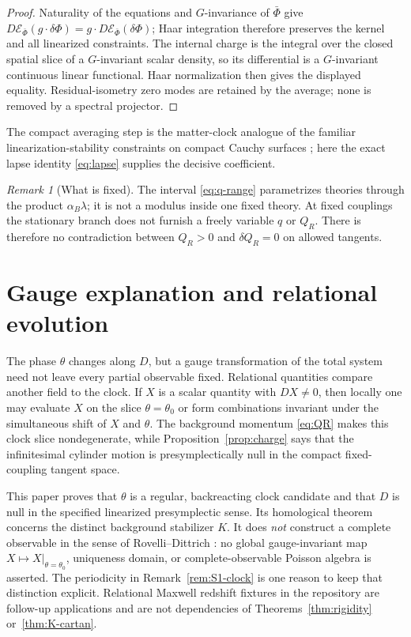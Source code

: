 \documentclass[11pt]{article}
\theoremstyle{definition}
\theoremstyle{remark}
\newtheorem{remark}[theorem]{Remark}
\begin{document}
\begin{proof}
Naturality of the equations and $G$-invariance of $\bar\Phi$ give
$D\mathcal E_{\bar\Phi}(g\cdot\delta\Phi)
=g\cdot D\mathcal E_{\bar\Phi}(\delta\Phi)$; Haar integration therefore
preserves the kernel and all linearized constraints.  The internal charge is
the integral over the closed spatial slice of a $G$-invariant scalar density,
so its differential is a $G$-invariant continuous linear functional.  Haar
normalization then gives the displayed equality.  Residual-isometry zero
modes are retained by the average; none is removed by a spectral projector.
\end{proof}

The compact averaging step is the matter-clock analogue of the familiar
linearization-stability constraints on compact Cauchy surfaces
\cite{LinearizationInstability,AMM}; here the exact lapse identity
\eqref{eq:lapse} supplies the decisive coefficient.

\begin{remark}[What is fixed]
The interval \eqref{eq:q-range} parametrizes theories through the product
$\alpha_B\lambda$; it is not a modulus inside one fixed theory.  At fixed
couplings the stationary branch does not furnish a freely variable $q$ or
$Q_R$.  There is therefore no contradiction between $Q_R>0$ and
$\delta Q_R=0$ on allowed tangents.
\end{remark}

\section{Gauge explanation and relational evolution}\label{sec:relational}

The phase $\theta$ changes along $D$, but a gauge transformation of the total
system need not leave every partial observable fixed.  Relational quantities
compare another field to the clock.  If $X$ is a scalar quantity with
$D X\ne0$, then locally one may evaluate $X$ on the slice
$\theta=\theta_0$ or form combinations invariant under the simultaneous
shift of $X$ and $\theta$.  The background momentum \eqref{eq:QR} makes this
clock slice nondegenerate, while Proposition~\ref{prop:charge} says that the
infinitesimal cylinder motion is presymplectically null in the compact
fixed-coupling tangent space.

This paper proves that $\theta$ is a regular, backreacting clock candidate and
that $D$ is null in the specified linearized presymplectic sense.  Its
homological theorem concerns the distinct background stabilizer $K$.
It does \emph{not} construct a complete observable in the sense of
Rovelli--Dittrich \cite{Rovelli,Dittrich}: no global gauge-invariant map
$X\mapsto X|_{\theta=\theta_0}$, uniqueness domain, or complete-observable
Poisson algebra is asserted.  The periodicity in Remark~\ref{rem:S1-clock}
is one reason to keep that distinction explicit.  Relational Maxwell
redshift fixtures in the repository are follow-up applications and are not
dependencies of Theorems~\ref{thm:rigidity} or~\ref{thm:K-cartan}.
\end{document}
